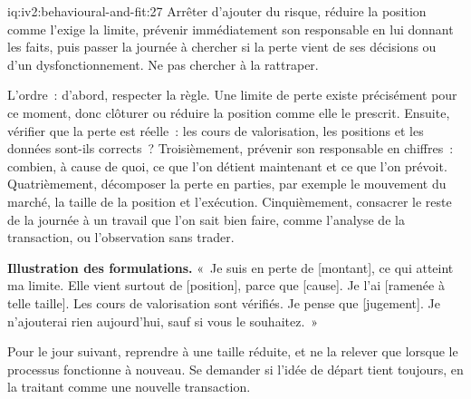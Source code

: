 \begin{solution}{iq:iv2:behavioural-and-fit:27}
Arrêter d'ajouter du risque, réduire la position comme l'exige la limite, prévenir immédiatement son responsable en lui donnant les faits, puis passer la journée à chercher si la perte vient de ses décisions ou d'un dysfonctionnement. Ne pas chercher à la rattraper.

L'ordre~: d'abord, respecter la règle. Une limite de perte existe précisément pour ce moment, donc clôturer ou réduire la position comme elle le prescrit. Ensuite, vérifier que la perte est réelle~: les cours de valorisation, les positions et les données sont-ils corrects~? Troisièmement, prévenir son responsable en chiffres~: combien, à cause de quoi, ce que l'on détient maintenant et ce que l'on prévoit. Quatrièmement, décomposer la perte en parties, par exemple le mouvement du marché, la taille de la position et l'exécution. Cinquièmement, consacrer le reste de la journée à un travail que l'on sait bien faire, comme l'analyse de la transaction, ou l'observation sans trader.

\textbf{Illustration des formulations.} «~Je suis en perte de [montant], ce qui atteint ma limite. Elle vient surtout de [position], parce que [cause]. Je l'ai [ramenée à telle taille]. Les cours de valorisation sont vérifiés. Je pense que [jugement]. Je n'ajouterai rien aujourd'hui, sauf si vous le souhaitez.~»

Pour le jour suivant, reprendre à une taille réduite, et ne la relever que lorsque le processus fonctionne à nouveau. Se demander si l'idée de départ tient toujours, en la traitant comme une nouvelle transaction.

\end{solution}

